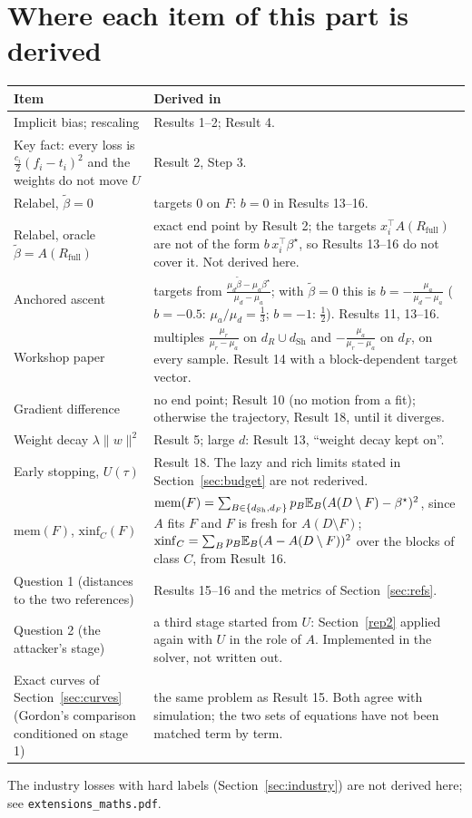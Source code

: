 \documentclass[10pt]{article}
\newcommand{\Rf}{R_{\mathrm{full}}}\newcommand{\Ff}{F_{\mathrm{full}}}\newcommand{\dSh}{d_{\mathrm{Sh}}}
\begin{document}
\section{Where each item of this part is derived}
\begin{center}\small\begin{tabular}{@{}>{\raggedright\arraybackslash}p{4.6cm}>{\raggedright\arraybackslash}p{10.6cm}@{}}\toprule
Item & Derived in\\\midrule
Implicit bias; rescaling & Results 1--2; Result 4.\\
Key fact: every loss is $\frac{c_i}2(f_i-t_i)^2$ and the weights do not move $U$ & Result 2, Step 3.\\
Relabel, $\tilde\beta=0$ & targets $0$ on $F$: $b=0$ in Results 13--16.\\
Relabel, oracle $\tilde\beta=A(\Rf)$ & exact end point by Result 2; the targets $x_i^\top A(\Rf)$ are not of the form $b\,x_i^\top\beta^\star$, so Results 13--16 do not cover it. Not derived here.\\
Anchored ascent & targets from $\frac{\mu_d\tilde\beta-\mu_a\beta^\star}{\mu_d-\mu_a}$; with $\tilde\beta=0$ this is $b=-\frac{\mu_a}{\mu_d-\mu_a}$ ($b=-0.5$: $\mu_a/\mu_d=\frac13$; $b=-1$: $\frac12$). Results 11, 13--16.\\
Workshop paper & multiples $\frac{\mu_r}{\mu_r-\mu_a}$ on $d_R\cup\dSh$ and $-\frac{\mu_a}{\mu_r-\mu_a}$ on $d_F$, on every sample. Result 14 with a block-dependent target vector.\\
Gradient difference & no end point; Result 10 (no motion from a fit); otherwise the trajectory, Result 18, until it diverges.\\
Weight decay $\lambda\|w\|^2$ & Result 5; large $d$: Result 13, ``weight decay kept on''.\\
Early stopping, $U(\tau)$ & Result 18. The lazy and rich limits stated in Section~\ref{sec:budget} are not rederived.\\
$\mathrm{mem}(F)$, $\mathrm{xinf}_C(F)$ & $\mathrm{mem}(F)=\sum_{B\in\{\dSh,d_F\}}p_B\E_B(A(D\setminus F)-\beta^\star)^2$, since $A$ fits $F$ and $F$ is fresh for $A(D\setminus F)$; $\mathrm{xinf}_C=\sum_Bp_B\mathbb E_B(A-A(D\setminus F))^2$ over the blocks of class $C$, from Result 16.\\
Question 1 (distances to the two references) & Results 15--16 and the metrics of Section~\ref{sec:refs}.\\
Question 2 (the attacker's stage) & a third stage started from $U$: Section~\ref{rep2} applied again with $U$ in the role of $A$. Implemented in the solver, not written out.\\
Exact curves of Section~\ref{sec:curves} (Gordon's comparison conditioned on stage 1) & the same problem as Result 15. Both agree with simulation; the two sets of equations have not been matched term by term.\\\bottomrule
\end{tabular}\end{center}
The industry losses with hard labels (Section~\ref{sec:industry}) are not derived here; see \texttt{extensions\_maths.pdf}.
\end{document}
